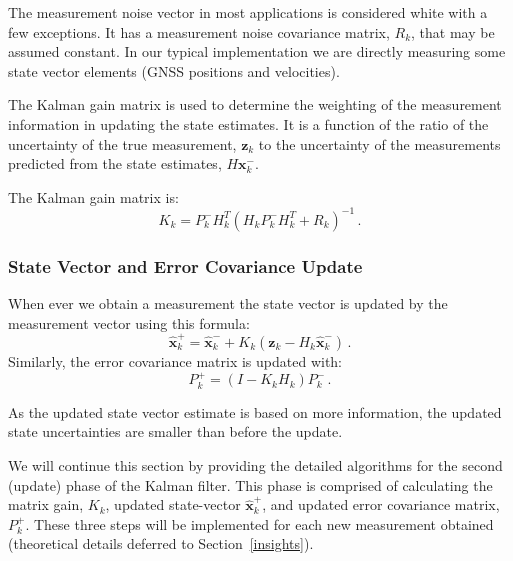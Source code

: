 \documentclass[journal]{IEEEtran}
\begin{document}
The measurement noise vector in most applications is considered white with a few exceptions. It has a measurement noise covariance matrix, $R_k$, that may be assumed constant.
In our typical implementation we are directly measuring some state vector elements (GNSS positions and velocities).\par
The Kalman gain matrix is used to determine the weighting of the measurement information in updating the state estimates. It is a function of the ratio of the uncertainty of the true measurement, $\boldsymbol{z}_k$ to the uncertainty of the measurements predicted from the state estimates, $H\boldsymbol{x}_k^-$.\par
The Kalman gain matrix is:
\begin{equation}
    K_k=P_k^-H_k^T(H_kP_k^-H_k^T+R_k)^{-1}\,.
\end{equation}


%
\subsubsection{State Vector and Error Covariance Update}
When ever we obtain a measurement the state vector is updated by the measurement vector using this formula:
\begin{equation}
    \hat{\boldsymbol{x}}_k^+=\hat{\boldsymbol{x}}_k^-+ K_k(\boldsymbol{z}_k- H_k\hat{\boldsymbol{x}}_k^-)\,.
\end{equation}
Similarly, the error covariance
matrix is updated with:
\begin{equation}
   P_k^+=(I- K_kH_k) P_k^-\,.
\end{equation}

As the updated state vector estimate is based on more information, the updated state uncertainties are smaller than before the update.\par
We will continue this section by providing the detailed algorithms for the second (update) phase of the Kalman filter. This phase is comprised of calculating the matrix gain, $K_k$, updated state-vector $\hat{\boldsymbol{x}}_k^+$, and updated error covariance matrix, $P_k^+$. These three steps will be implemented for each new measurement obtained (theoretical details deferred to Section~\ref{insights}).


%
\end{document}
